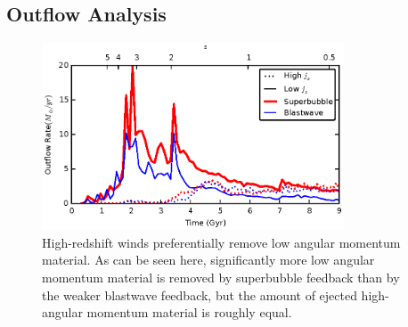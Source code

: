 \subsection{Outflow Analysis}
\begin{figure}
    \includegraphics[width=0.8\textwidth]{figures2/angular_momentum_outflow.eps}
    \caption[High redshift winds remove low angular momentum gas]{High-redshift
    winds preferentially remove low angular momentum material.  As can be seen
    here, significantly more low angular momentum material is removed by
    superbubble feedback than by the weaker blastwave feedback, but the amount
    of ejected high-angular momentum material is roughly equal.}
        \label{angular_momentum_outflow2}
\end{figure}
